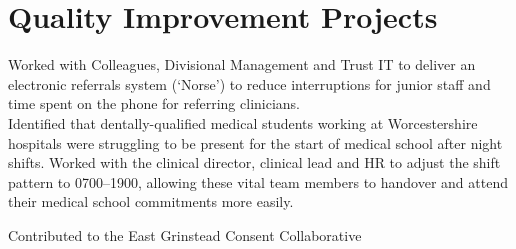 \section*{Quality Improvement Projects}

 Worked with Colleagues, Divisional Management and Trust IT to deliver an electronic referrals system (`Norse') to reduce interruptions for junior staff and time spent on the phone for referring clinicians.
\\
 Identified that dentally-qualified medical students working at Worcestershire hospitals were struggling to be present for the start of medical school after night shifts. Worked with the clinical director, clinical lead and HR to adjust the shift pattern to 0700--1900, allowing these vital team members to handover and attend their medical school commitments more easily.

 Contributed to the East Grinstead Consent Collaborative
